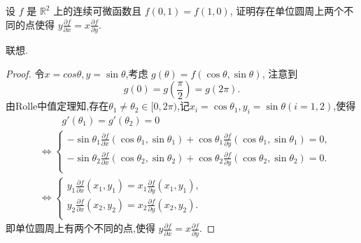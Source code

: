 \documentclass[../../main.tex]{subfiles}%
\begin{document}
\begin{example}
设 \( f \) 是 \( \mathbb{R}^2 \) 上的连续可微函数且 \( f(0, 1) = f(1, 0) \), 证明存在单位圆周上两个不同的点使得 \( y \frac{\partial f}{\partial x} = x \frac{\partial f}{\partial y} \).
\end{example}
\begin{note}
联想.
\end{note}
\begin{proof}
令$x=cos\theta ,y=\sin\theta $,考虑 \( g(\theta) = f(\cos \theta, \sin \theta) \), 注意到
\[
g(0) = g\left( \frac{\pi}{2} \right) = g(2\pi).
\]
由Rolle中值定理知,存在$\theta_1\ne \theta_2 \in [0,2\pi)$,记$x_i=\cos\theta_1,y_i=\sin\theta(i=1,2)$,使得
\begin{align*}
&\quad \quad \,\,g' \left( \theta _1 \right) =g' \left( \theta _2 \right) =0
\\
&\Longleftrightarrow \begin{cases}
-\sin \theta _1\frac{\partial f}{\partial x}\left( \cos \theta _1,\sin \theta _1 \right) +\cos \theta _1\frac{\partial f}{\partial y}\left( \cos \theta _1,\sin \theta _1 \right) =0,\\
-\sin \theta _2\frac{\partial f}{\partial x}\left( \cos \theta _2,\sin \theta _2 \right) +\cos \theta _2\frac{\partial f}{\partial y}\left( \cos \theta _2,\sin \theta _2 \right) =0.\\
\end{cases}
\\
&\Longleftrightarrow \begin{cases}
y_1\frac{\partial f}{\partial x}\left( x_1,y_1 \right) =x_1\frac{\partial f}{\partial y}\left( x_1,y_1 \right) ,\\
y_2\frac{\partial f}{\partial x}\left( x_2,y_2 \right) =x_2\frac{\partial f}{\partial y}\left( x_2,y_2 \right).\\
\end{cases}
\end{align*}
即单位圆周上有两个不同的点,使得 \( y \frac{\partial f}{\partial x} = x \frac{\partial f}{\partial y} \).
\end{proof}
\end{document}
